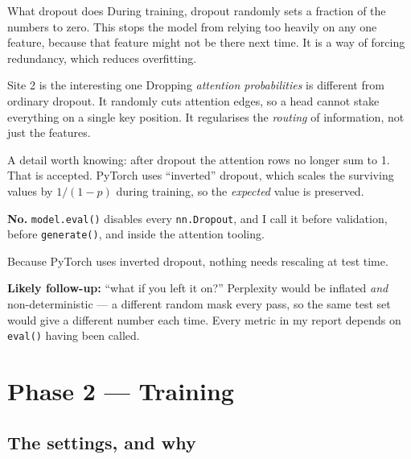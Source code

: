 \documentclass[11pt]{report}
\newcommand{\p}[1]{\texttt{#1}}
\begin{document}
\begin{concept}{What dropout does}
During training, dropout randomly sets a fraction of the numbers to zero. This
stops the model from relying too heavily on any one feature, because that
feature might not be there next time. It is a way of forcing redundancy, which
reduces overfitting.
\end{concept}

\begin{implementation}{Site 2 is the interesting one}
Dropping \emph{attention probabilities} is different from ordinary dropout. It
randomly cuts attention edges, so a head cannot stake everything on a single key
position. It regularises the \emph{routing} of information, not just the
features.

A detail worth knowing: after dropout the attention rows no longer sum to 1.
That is accepted. PyTorch uses ``inverted'' dropout, which scales the surviving
values by $1/(1-p)$ during training, so the \emph{expected} value is preserved.
\end{implementation}

\begin{warnbox}
\textbf{No.} \p{model.eval()} disables every \p{nn.Dropout}, and I call it before
validation, before \p{generate()}, and inside the attention tooling.

Because PyTorch uses inverted dropout, nothing needs rescaling at test time.

\medskip
\textbf{Likely follow-up:} ``what if you left it on?'' Perplexity would be
inflated \emph{and} non-deterministic --- a different random mask every pass, so
the same test set would give a different number each time. Every metric in my
report depends on \p{eval()} having been called.
\end{warnbox}

\chapter{Phase 2 --- Training}

\section{The settings, and why}
\end{document}
